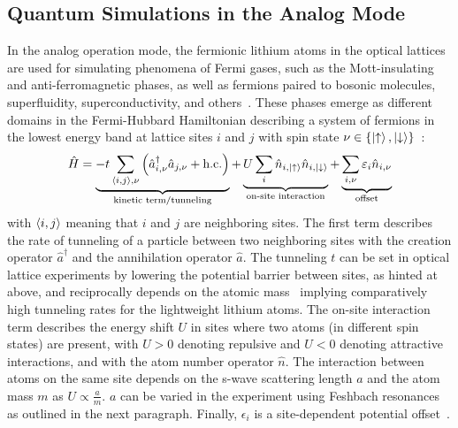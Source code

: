 \subsection*{Quantum Simulations in the Analog Mode}\label{ch:analog_mode}
In the analog operation mode, the fermionic lithium atoms in the optical lattices are used for simulating phenomena of Fermi gases, such as the Mott-insulating and anti-ferromagnetic phases, as well as fermions paired to bosonic molecules, superfluidity,  superconductivity, and others~\cite{bloch_quantum_2012,esslinger_fermi-hubbard_2010}. These phases emerge as different domains in the Fermi-Hubbard Hamiltonian describing a system of fermions in the lowest energy band at lattice sites $i$ and $j$ with spin state $\nu \in \{\Ket{\uparrow}, \Ket{\downarrow}\}$~\cite{hubbard_electron_1963,esslinger_fermi-hubbard_2010}:
\begin{align}\label{eq:fermi_hubbard_hamiltonian}
    \hat H =
    \underbrace{-t \sum\limits_{\Braket{i,j}, \nu} \left(\hat a^\dagger_{i, \nu} \hat a_{j, \nu} + \text{h.c.}\right)}_\text{kinetic term/tunneling}
    + \underbrace{U \sum\limits_i \hat n_{i, \Ket{\uparrow}} \hat n_{i, \Ket{\downarrow}}}_\text{on-site interaction}
    + \underbrace{\sum\limits_{i, \nu} \epsilon_{i} \hat n_{i, \nu}}_\text{offset}
\end{align}
with $\Braket{i,j}$ meaning that $i$ and $j$ are neighboring sites. The first term describes the rate of tunneling of a particle between two neighboring sites with the creation operator $\hat a^\dagger$ and the annihilation operator $\hat a$. The tunneling $t$ can be set in optical lattice experiments by lowering the potential barrier between sites, as hinted at above, and reciprocally depends on the atomic mass~\cite{jaksch_cold_1998} implying comparatively high tunneling rates for the lightweight lithium atoms. The on-site interaction term describes the energy shift $U$ in sites where two atoms (in different spin states) are present, with $U > 0$ denoting repulsive and $U < 0$ denoting attractive interactions, and with the atom number operator  $\hat n$. The interaction between atoms on the same site depends on the s-wave scattering length $a$ and the atom mass $m$ as $U \propto \frac{a}{m}$. $a$ can be varied in the experiment using Feshbach resonances as outlined in the next paragraph. Finally, $\epsilon_i$ is a site-dependent potential offset~\cite{esslinger_fermi-hubbard_2010}.

